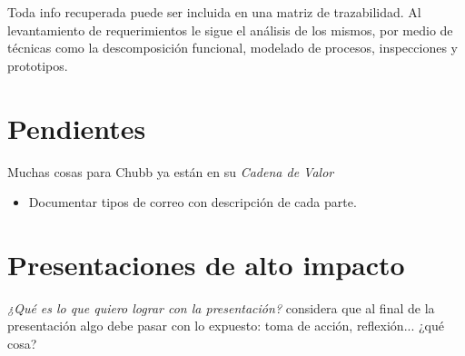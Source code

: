 \documentclass[12pt]{article} %
\begin{document}
Toda info recuperada puede ser incluida en una matriz de trazabilidad. Al levantamiento de requerimientos le sigue el análisis de los mismos, por medio de técnicas como la descomposición funcional, modelado de procesos, inspecciones y prototipos.


\section{Pendientes}
Muchas cosas para Chubb ya están en su \emph{Cadena de Valor}
\begin{itemize}
\item Documentar tipos de correo con descripción de cada parte.
\end{itemize}

\section{Presentaciones de alto impacto}
\emph{¿Qué es lo que quiero lograr con la presentación?} considera que al final de la presentación algo debe pasar con lo expuesto: toma de acción, reflexión... ¿qué cosa?
\end{document}
